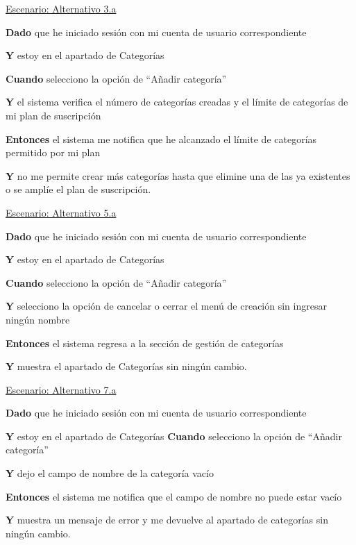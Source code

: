 \vspace{0.20cm}



\underline{Escenario: Alternativo 3.a}\par
\vspace{0.15cm}

\textbf{Dado} que he iniciado sesión con mi cuenta de usuario correspondiente\par
\textbf{Y} estoy en el apartado de Categorías\par
\textbf{Cuando} selecciono la opción de “Añadir categoría”\par
\textbf{Y} el sistema verifica el número de categorías creadas y el límite de categorías de mi plan de suscripción\par
\textbf{Entonces} el sistema me notifica que he alcanzado el límite de categorías permitido por mi plan\par
\textbf{Y} no me permite crear más categorías hasta que elimine una de las ya existentes o se amplíe el plan de suscripción.\par
\vspace{0.20cm}

\underline{Escenario: Alternativo 5.a}\par
\vspace{0.15cm}

\textbf{Dado} que he iniciado sesión con mi cuenta de usuario correspondiente\par
\textbf{Y} estoy en el apartado de Categorías\par
\textbf{Cuando} selecciono la opción de “Añadir categoría”\par
\textbf{Y} selecciono la opción de cancelar o cerrar el menú de creación sin ingresar ningún nombre\par
\textbf{Entonces} el sistema regresa a la sección de gestión de categorías\par
\textbf{Y} muestra el apartado de Categorías sin ningún cambio.\par

\vspace{0.20cm}

\underline{Escenario: Alternativo 7.a}\par
\vspace{0.15cm}

\textbf{Dado} que he iniciado sesión con mi cuenta de usuario correspondiente\par
\textbf{Y} estoy en el apartado de Categorías
\textbf{Cuando} selecciono la opción de “Añadir categoría”\par
\textbf{Y} dejo el campo de nombre de la categoría vacío\par
\textbf{Entonces} el sistema me notifica que el campo de nombre no puede estar vacío\par
\textbf{Y} muestra un mensaje de error y me devuelve al apartado de categorías sin ningún cambio.\par

